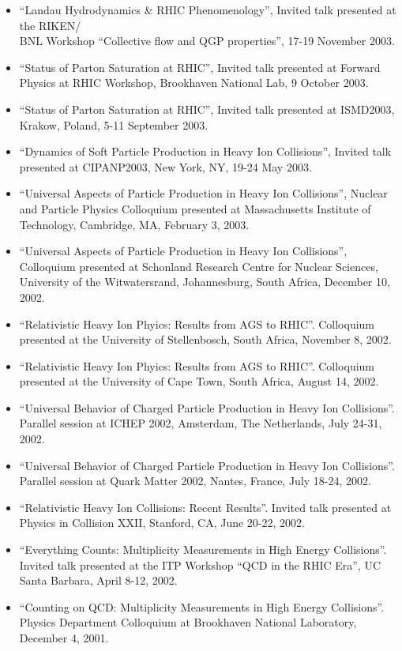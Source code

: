 \documentclass[11 pt]{article}
\begin{document}
\begin{description}
\begin{itemize}
\item ``Landau Hydrodynamics \& RHIC Phenomenology'', Invited talk presented at the RIKEN/\\BNL Workshop ``Collective flow and QGP properties'', 17-19 November 2003.
\item ``Status of Parton Saturation at RHIC'', Invited talk presented at Forward Physics at RHIC Workshop, Brookhaven National Lab, 9 October 2003.
\item ``Status of Parton Saturation at RHIC'', Invited talk presented at ISMD2003, Krakow, Poland, 5-11 September 2003.
\item ``Dynamics of Soft Particle Production in Heavy Ion Collisions'', Invited talk presented at CIPANP2003, New York, NY, 19-24 May 2003.
\item ``Universal Aspects of Particle Production in Heavy Ion Collisions'', Nuclear and Particle Physics Colloquium presented at Massachusetts Institute of Technology, Cambridge, MA, February 3, 2003.
\item ``Universal Aspects of Particle Production in Heavy Ion Collisions'', Colloquium presented at Schonland Research Centre for Nuclear Sciences, University of the Witwatersrand, Johannesburg, South Africa, December 10, 2002.
\item ``Relativistic Heavy Ion Phyics: Results from AGS to RHIC''.  Colloquium presented at the University of Stellenbosch, South Africa, November 8, 2002.
\item ``Relativistic Heavy Ion Phyics: Results from AGS to RHIC''.  Colloquium presented at the University of Cape Town, South Africa, August 14, 2002.
\item ``Universal Behavior of Charged Particle Production in Heavy Ion Collisions''.  Parallel session at ICHEP 2002, Amsterdam, The Netherlands, July 24-31, 2002.
\item ``Universal Behavior of Charged Particle Production in Heavy Ion Collisions''.  Parallel session at Quark Matter 2002, Nantes, France, July 18-24, 2002.
\item ``Relativistic Heavy Ion Collisions: Recent Results''.  Invited talk presented at Physics in Collision XXII, Stanford, CA, June 20-22, 2002.
\item ``Everything Counts: Multiplicity Measurements in High Energy Collisions''.  Invited talk presented at the ITP Workshop ``QCD in the RHIC Era'', UC Santa Barbara, April 8-12, 2002.
\item ``Counting on QCD: Multiplicity Measurements in High Energy Collisions''.  Physics Department Colloquium at Brookhaven National Laboratory, December 4, 2001.

\end{itemize}
\end{description}
\end{document}
